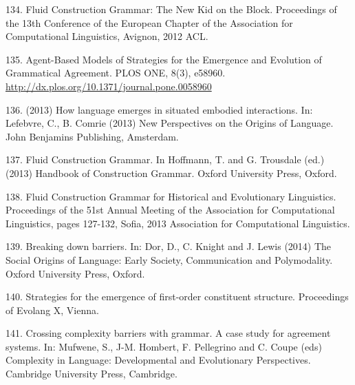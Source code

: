 134. \citet{Vantrijp:12q} Fluid Construction Grammar: The New Kid on the Block. Proceedings of the 13th Conference of the European Chapter of the Association for Computational Linguistics, Avignon, 2012 ACL.

135. \citet{Beuls:13a} Agent-Based Models of Strategies for the Emergence and Evolution of Grammatical Agreement. PLOS ONE, 8(3), e58960. \url{http://dx.plos.org/10.1371/journal.pone.0058960}

136. \citet{Steels:13b} (2013) How language emerges in situated embodied interactions. In: Lefebvre, C., B. Comrie (2013) New Perspectives on the Origins of Language. John Benjamins Publishing, Amsterdam. 

137. \citet{Steels:13c} Fluid Construction Grammar. In Hoffmann, T. and G. Trousdale (ed.) (2013) Handbook of Construction Grammar. Oxford University Press, Oxford. 

138. \citet{wellens:13d} Fluid Construction Grammar for Historical and Evolutionary Linguistics. Proceedings of the 51st Annual Meeting of the Association for Computational Linguistics, pages 127-132, Sofia, 2013 Association for Computational Linguistics.

139. \citet{Steels:14a} Breaking down barriers. In: Dor, D., C. Knight and J. Lewis (2014) The Social Origins of Language: Early Society, Communication and Polymodality. Oxford University Press, Oxford. 

140. \citet{Garcia:14b} Strategies for the emergence of first-order constituent structure. Proceedings of 
Evolang X, Vienna. 

141. \citet{Steels:14c} Crossing complexity barriers with grammar. A case study for agreement systems. In: Mufwene, S., J-M. Hombert, F. Pellegrino and C. Coupe (eds) Complexity in Language: Developmental and Evolutionary Perspectives. Cambridge University Press, Cambridge. 
